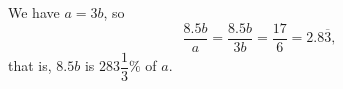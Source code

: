 We have $a=3b$, so
\[\dfrac{8.5b}{a}=\dfrac{8.5b}{3b}=\dfrac{17}{6}=2.8\overline{3},\]
that is, $8.5b$ is $\boxed{283\dfrac13\%}$ of $a$.

